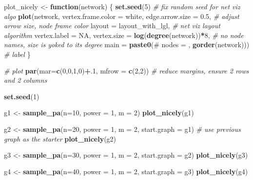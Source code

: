 \documentclass[
]{book}
\newenvironment{Shaded}{\begin{snugshade}}{\end{snugshade}}
\newcommand{\AttributeTok}[1]{\textcolor[rgb]{0.13,0.29,0.53}{#1}}
\newcommand{\CommentTok}[1]{\textcolor[rgb]{0.56,0.35,0.01}{\textit{#1}}}
\newcommand{\ConstantTok}[1]{\textcolor[rgb]{0.56,0.35,0.01}{#1}}
\newcommand{\ControlFlowTok}[1]{\textcolor[rgb]{0.13,0.29,0.53}{\textbf{#1}}}
\newcommand{\DecValTok}[1]{\textcolor[rgb]{0.00,0.00,0.81}{#1}}
\newcommand{\FloatTok}[1]{\textcolor[rgb]{0.00,0.00,0.81}{#1}}
\newcommand{\FunctionTok}[1]{\textcolor[rgb]{0.13,0.29,0.53}{\textbf{#1}}}
\newcommand{\NormalTok}[1]{#1}
\newcommand{\OtherTok}[1]{\textcolor[rgb]{0.56,0.35,0.01}{#1}}
\newcommand{\SpecialCharTok}[1]{\textcolor[rgb]{0.81,0.36,0.00}{\textbf{#1}}}
\newcommand{\StringTok}[1]{\textcolor[rgb]{0.31,0.60,0.02}{#1}}
\begin{document}
\begin{Shaded}
\begin{Highlighting}[]
\NormalTok{plot\_nicely }\OtherTok{\textless{}{-}} \ControlFlowTok{function}\NormalTok{(network) \{ }
  \FunctionTok{set.seed}\NormalTok{(}\DecValTok{5}\NormalTok{) }\CommentTok{\# fix random seed for net viz algo }
  \FunctionTok{plot}\NormalTok{(network, }\AttributeTok{vertex.frame.color =} \StringTok{\textquotesingle{}white\textquotesingle{}}\NormalTok{, }\AttributeTok{edge.arrow.size =} \FloatTok{0.5}\NormalTok{, }\CommentTok{\# adjust arrow size, node frame color}
       \AttributeTok{layout =}\NormalTok{ layout\_with\_lgl, }\CommentTok{\# net viz layout algorithm  }
       \AttributeTok{vertex.label =} \ConstantTok{NA}\NormalTok{, }\AttributeTok{vertex.size =} \FunctionTok{log}\NormalTok{(}\FunctionTok{degree}\NormalTok{(network))}\SpecialCharTok{*}\DecValTok{8}\NormalTok{, }\CommentTok{\# no node names, size is yoked to its degree}
       \AttributeTok{main =} \FunctionTok{paste0}\NormalTok{(}\StringTok{\textquotesingle{}\# nodes = \textquotesingle{}}\NormalTok{, }\FunctionTok{gorder}\NormalTok{(network))) }\CommentTok{\# label }
\NormalTok{\}}

\CommentTok{\# plot}
\FunctionTok{par}\NormalTok{(}\AttributeTok{mar=}\FunctionTok{c}\NormalTok{(}\DecValTok{0}\NormalTok{,}\DecValTok{0}\NormalTok{,}\DecValTok{1}\NormalTok{,}\DecValTok{0}\NormalTok{)}\SpecialCharTok{+}\NormalTok{.}\DecValTok{1}\NormalTok{, }\AttributeTok{mfrow =} \FunctionTok{c}\NormalTok{(}\DecValTok{2}\NormalTok{,}\DecValTok{2}\NormalTok{)) }
\CommentTok{\# reduce margins, ensure 2 rows and 2 columns }

\FunctionTok{set.seed}\NormalTok{(}\DecValTok{1}\NormalTok{)}

\NormalTok{g1 }\OtherTok{\textless{}{-}} \FunctionTok{sample\_pa}\NormalTok{(}\AttributeTok{n=}\DecValTok{10}\NormalTok{, }\AttributeTok{power =} \DecValTok{1}\NormalTok{, }\AttributeTok{m =} \DecValTok{2}\NormalTok{)  }
\FunctionTok{plot\_nicely}\NormalTok{(g1)}

\NormalTok{g2 }\OtherTok{\textless{}{-}} \FunctionTok{sample\_pa}\NormalTok{(}\AttributeTok{n=}\DecValTok{20}\NormalTok{, }\AttributeTok{power =} \DecValTok{1}\NormalTok{, }\AttributeTok{m =} \DecValTok{2}\NormalTok{, }
                \AttributeTok{start.graph =}\NormalTok{ g1) }\CommentTok{\# use previous graph as the starter }
\FunctionTok{plot\_nicely}\NormalTok{(g2)}

\NormalTok{g3 }\OtherTok{\textless{}{-}} \FunctionTok{sample\_pa}\NormalTok{(}\AttributeTok{n=}\DecValTok{30}\NormalTok{, }\AttributeTok{power =} \DecValTok{1}\NormalTok{, }\AttributeTok{m =} \DecValTok{2}\NormalTok{, }\AttributeTok{start.graph =}\NormalTok{ g2)}
\FunctionTok{plot\_nicely}\NormalTok{(g3)}

\NormalTok{g4 }\OtherTok{\textless{}{-}} \FunctionTok{sample\_pa}\NormalTok{(}\AttributeTok{n=}\DecValTok{40}\NormalTok{, }\AttributeTok{power =} \DecValTok{1}\NormalTok{, }\AttributeTok{m =} \DecValTok{2}\NormalTok{, }\AttributeTok{start.graph =}\NormalTok{ g3)}
\FunctionTok{plot\_nicely}\NormalTok{(g4)}
\end{Highlighting}
\end{Shaded}
\end{document}
